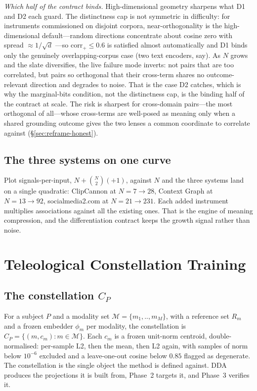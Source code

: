 \documentclass[10pt,twocolumn]{article}
\begin{document}
\emph{Which half of the contract binds.} High-dimensional geometry sharpens what
D1 and D2 each guard. The distinctness cap is not symmetric in difficulty: for
instruments commissioned on disjoint corpora, near-orthogonality is the
high-dimensional default---random directions concentrate about cosine zero with
spread ${\approx}1/\sqrt{d}$ \citep{vershynin2018hdp,gorban2018blessing}---so
$\mathrm{corr}_+\le 0.6$ is satisfied almost automatically and D1 binds only the
genuinely overlapping-corpus case (two text encoders, say). As $N$ grows and the
slate diversifies, the live failure mode inverts: not pairs that are too
correlated, but pairs so orthogonal that their cross-term shares no
outcome-relevant direction and degrades to noise. That is the case D2 catches,
which is why the marginal-bits condition, not the distinctness cap, is the binding
half of the contract at scale. The risk is sharpest for cross-domain pairs---the
most orthogonal of all---whose cross-terms are well-posed as meaning only when a
shared grounding outcome gives the two lenses a common coordinate to correlate
against (\S\ref{sec:reframe-honest}).

\subsection{The three systems on one curve}
Plot signals-per-input, $N+\binom{N}{2}(+1)$, against $N$ and the three systems
land on a single quadratic: ClipCannon at $N=7\to28$, Context Graph at
$N=13\to92$, socialmedia2.com at $N=21\to231$. Each added instrument multiplies associations
against all the existing ones. That is the engine of meaning compression, and the
differentiation contract keeps the growth signal rather than noise.

\section{Teleological Constellation Training}
\label{sec:tct}

\subsection{The constellation $C_P$}
For a subject $P$ and a modality set $\mathcal{M}=\{m_1,..,m_M\}$, with a reference
set $R_m$ and a frozen embedder $\phi_m$ per modality, the constellation is
$C_P=\{(m,c_m):m\in\mathcal{M}\}$. Each $c_m$ is a frozen unit-norm centroid,
double-normalised: per-sample L2, then the mean, then L2 again, with samples of
norm below $10^{-6}$ excluded and a leave-one-out cosine below $0.85$ flagged as
degenerate. The constellation is the single object the method is defined against.
DDA produces the projections it is built from, Phase~2 targets it, and Phase~3
verifies it.
\end{document}
